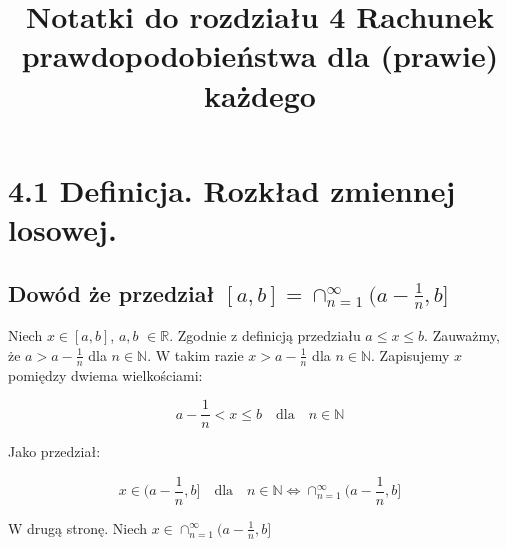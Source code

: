 \documentclass[12pt, letterpaper, twoside]{article}
\title{Notatki do rozdziału 4 Rachunek prawdopodobieństwa dla (prawie) każdego}
\author{}
\date{}
\begin{document}
\begin{titlepage}
\maketitle
\end{titlepage}


\section{4.1 Definicja. Rozkład zmiennej losowej.}
\subsection{Dowód że przedział $[a,b] = \cap_{n=1}^{\infty}(a - \frac{1}{n}, b]$}

Niech $x \in [a,b]$, $a,b$ $\in \mathbb{R}$. Zgodnie z definicją przedziału
$a \leq x \leq b$. Zauważmy, że $a > a - \frac{1}{n}$ dla $n \in \mathbb{N}$. W takim razie
$x > a - \frac{1}{n}$ dla $n \in \mathbb{N}$. Zapisujemy $x$ pomiędzy
dwiema wielkościami:

\begin{equation*}
    a - \frac{1}{n} < x \leq b  \quad \textrm{dla} \quad n \in \mathbb{N}
\end{equation*}

\noindent
Jako przedział:

\begin{equation*}
    x \in (a - \frac{1}{n}, b] \quad \textrm{dla} \quad n \in \mathbb{N} \iff \cap_{n=1}^{\infty}(a - \frac{1}{n}, b]
\end{equation*}

\vspace{10mm}
\noindent
W drugą stronę. Niech $x \in \cap_{n=1}^{\infty}(a - \frac{1}{n}, b]$
\end{document}

